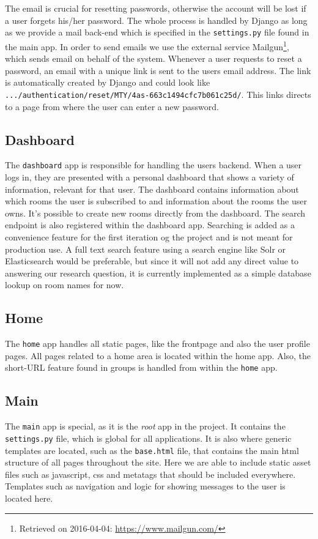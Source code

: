 The email is crucial for resetting passwords, otherwise the account will be lost if a user forgets his/her password. The whole process is handled by Django as long as we provide a mail back-end which is specified in the \texttt{settings.py} file found in the main app. In order to send emails we use the external service Mailgun\footnote{Retrieved on 2016-04-04: \url{https://www.mailgun.com/}}, which sends email on behalf of the system. Whenever a user requests to reset a password, an email with a unique link is sent to the users email address. The link is automatically created by Django and could look like \texttt{.../authentication/reset/MTY/4as-663c1494cfc7b061c25d/}. This links directs to a page from where the user can enter a new password.

\subsection{Dashboard}
The \texttt{dashboard} app is responsible for handling the users backend. When a user logs in, they are presented with a personal dashboard that shows a variety of information, relevant for that user.
The dashboard contains information about which rooms the user is subscribed to and information about the rooms the user owns. It's possible to create new rooms directly from the dashboard. The search endpoint is also registered within the dashboard app. Searching is added as a convenience feature for the first iteration og the project and is not meant for production use. A full text search feature using a search engine like Solr or Elasticsearch would be preferable, but since it will not add any direct value to answering our research question, it is currently implemented as a simple database lookup on room names for now.

\subsection{Home} 
The \texttt{home} app handles all static pages, like the frontpage and also the user profile pages.
All pages related to a home area is located within the home app. Also, the short-URL feature found in groups is handled from within the \texttt{home} app.

\subsection{Main}
The \texttt{main} app is special, as it is the \emph{root} app in the project. It contains the \texttt{settings.py} file, which is global for all applications. It is also where generic templates are located, such as the \texttt{base.html} file, that contains the main html structure of all pages throughout the site. Here we are able to include static asset files such as javascript, css and metatags that should be included everywhere. Templates such as navigation and logic for showing messages to the user is located here.

